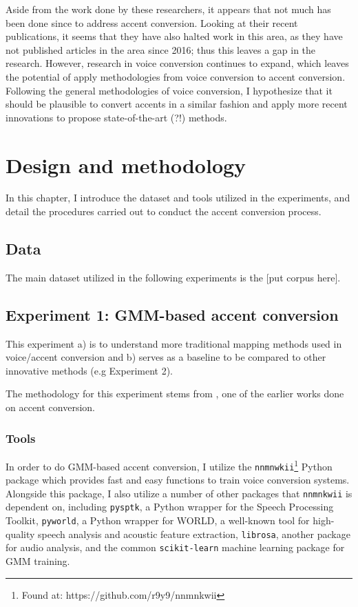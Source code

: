 \documentclass
[
    a4paper,
    twoside,
    12pt
]
{report}
\begin{document}
Aside from the work done by these researchers, it appears that not much
has been done since to address accent conversion. Looking at their
recent publications, it seems that they have also halted work in this
area, as they have not published articles in the area since 2016; thus
this leaves a gap in the research. However, research in voice conversion
continues to expand, which leaves the potential of apply methodologies
from voice conversion to accent conversion. Following the general
methodologies of voice conversion, I hypothesize that it should be
plausible to convert accents in a similar fashion and apply more recent
innovations to propose state-of-the-art (?!) methods.
\cleardoublepage
\chapter{Design and methodology}

In this chapter, I introduce the dataset and tools utilized in the
experiments, and detail the procedures carried out to conduct the accent
conversion process.

\hypertarget{data}{%
\section{Data}\label{data}}

The main dataset utilized in the following experiments is the {[}put
corpus here{]}.

\hypertarget{experiment-1-gmm-based-accent-conversion}{%
\section{Experiment 1: GMM-based accent
conversion}\label{experiment-1-gmm-based-accent-conversion}}

This experiment a) is to understand more traditional mapping methods
used in voice/accent conversion and b) serves as a baseline to be
compared to other innovative methods (e.g Experiment 2).

The methodology for this experiment stems from \textcite{aryal2014}, one
of the earlier works done on accent conversion.

\hypertarget{tools}{%
\subsection{Tools}\label{tools}}

In order to do GMM-based accent conversion, I utilize the
\texttt{nnmnwkii}\footnote{Found at: https://github.com/r9y9/nnmnkwii}
Python package which provides fast and easy functions to train voice
conversion systems. Alongside this package, I also utilize a number of
other packages that \texttt{nnmnkwii} is dependent on, including
\texttt{pysptk}, a Python wrapper for the Speech Processing Toolkit,
\texttt{pyworld}, a Python wrapper for WORLD, a well-known tool for
high-quality speech analysis and acoustic feature extraction,
\texttt{librosa}, another package for audio analysis, and the common
\texttt{scikit-learn} machine learning package for GMM training.
\end{document}
